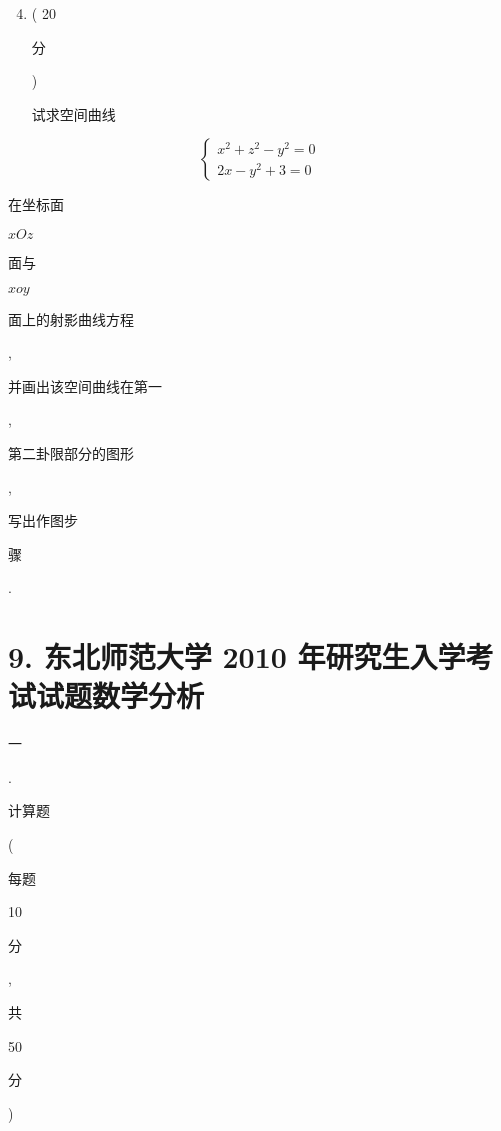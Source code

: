 \documentclass[10pt]{article}
\begin{document}
\begin{enumerate}
  \setcounter{enumi}{3}
  \item ( 20 \begin{CJK}{UTF8}{mj}分\end{CJK}) \begin{CJK}{UTF8}{mj}试求空间曲线\end{CJK}
\end{enumerate}
$$
\left\{\begin{array}{l}
x^{2}+z^{2}-y^{2}=0 \\
2 x-y^{2}+3=0
\end{array}\right.
$$
\begin{CJK}{UTF8}{mj}在坐标面\end{CJK} $x O z$ \begin{CJK}{UTF8}{mj}面与\end{CJK} $x o y$ \begin{CJK}{UTF8}{mj}面上的射影曲线方程\end{CJK}, \begin{CJK}{UTF8}{mj}并画出该空间曲线在第一\end{CJK}, \begin{CJK}{UTF8}{mj}第二卦限部分的图形\end{CJK}, \begin{CJK}{UTF8}{mj}写出作图步\end{CJK} \begin{CJK}{UTF8}{mj}骤\end{CJK}.

\section{9. 东北师范大学 2010 年研究生入学考试试题数学分析}
\begin{CJK}{UTF8}{mj}一\end{CJK}. \begin{CJK}{UTF8}{mj}计算题\end{CJK} (\begin{CJK}{UTF8}{mj}每题\end{CJK} 10 \begin{CJK}{UTF8}{mj}分\end{CJK}, \begin{CJK}{UTF8}{mj}共\end{CJK} 50 \begin{CJK}{UTF8}{mj}分\end{CJK})
\end{document}
